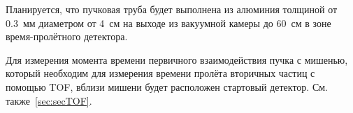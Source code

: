 Планируется, что пучковая труба будет выполнена из алюминия толщиной от 0.3~мм диаметром от 4~см на выходе из вакуумной камеры до 60~см в зоне время-пролётного детектора.

Для измерения момента времени первичного взаимодействия пучка с мишенью, который необходим для измерения времени пролёта вторичных частиц с помощью TOF, вблизи мишени будет расположен стартовый детектор. См. также~\ref{sec:secTOF}.

